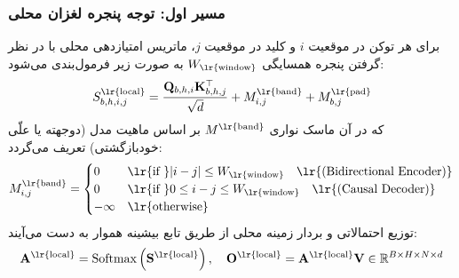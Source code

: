 \subsubsection*{مسیر اول: توجه پنجره لغزان محلی }
برای هر توکن در موقعیت $i$ و کلید در موقعیت $j$، ماتریس امتیازدهی محلی با در نظر گرفتن پنجره همسایگی $W_{\text{\lr{window}}}$ به صورت زیر فرمول‌بندی می‌شود:
\begin{equation}
S_{b, h, i, j}^{\text{\lr{local}}} = \frac{\mathbf{Q}_{b, h, i} \mathbf{K}_{b, h, j}^\top}{\sqrt{d}} + M_{i, j}^{\text{\lr{band}}} + M_{b, j}^{\text{\lr{pad}}}
\end{equation}
که در آن ماسک نواری $M^{\text{\lr{band}}}$ بر اساس ماهیت مدل (دوجهته یا علّی خودبازگشتی) تعریف می‌گردد:
\begin{equation}
M_{i, j}^{\text{\lr{band}}} = \begin{cases} 
0 & \text{\lr{if }} |i - j| \le W_{\text{\lr{window}}} \quad \text{\lr{(Bidirectional Encoder)}} \\
0 & \text{\lr{if }} 0 \le i - j \le W_{\text{\lr{window}}} \quad \text{\lr{(Causal Decoder)}} \\
-\infty & \text{\lr{otherwise}}
\end{cases}
\end{equation}
توزیع احتمالاتی و بردار زمینه محلی از طریق تابع بیشینه هموار به دست می‌آیند:
\begin{equation}
\mathbf{A}^{\text{\lr{local}}} = \operatorname{Softmax}\left( \mathbf{S}^{\text{\lr{local}}} \right), \quad \mathbf{O}^{\text{\lr{local}}} = \mathbf{A}^{\text{\lr{local}}} \mathbf{V} \in \mathbb{R}^{B \times H \times N \times d}
\end{equation}


